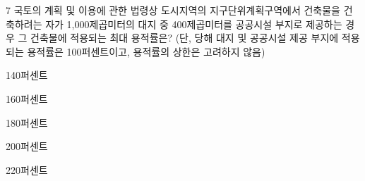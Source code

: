 \begin{question}{7}
국토의 계획 및 이용에 관한 법령상 도시지역의 지구단위계획구역에서 건축물을 건축하려는 자가 1,000제곱미터의 대지 중 400제곱미터를 공공시설 부지로 제공하는 경우 그 건축물에 적용되는 최대 용적률은? (단, 당해 대지 및 공공시설 제공 부지에 적용되는 용적률은 100퍼센트이고, 용적률의 상한은 고려하지 않음)
\begin{choices}
  \item 140퍼센트
  \item 160퍼센트
  \item 180퍼센트
  \item 200퍼센트
  \item 220퍼센트
\end{choices}
\end{question}
